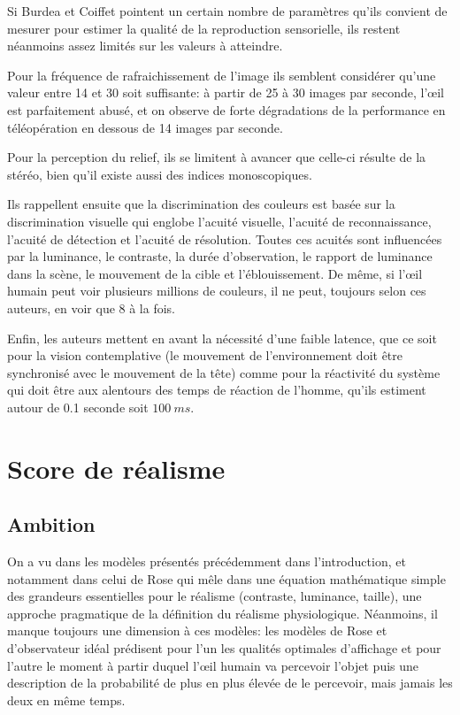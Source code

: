 	\par Si Burdea et Coiffet pointent un certain nombre de paramètres qu'ils convient de mesurer pour estimer la qualité de la reproduction sensorielle, ils restent néanmoins assez limités sur les valeurs à atteindre.
	
	\par Pour la fréquence de rafraichissement de l'image ils semblent considérer qu'une valeur entre 14 et 30 soit suffisante: à partir de 25 à 30 images par seconde, l'œil est parfaitement abusé, et on observe de forte dégradations de la performance en téléopération en dessous de 14 images par seconde.
	
	\par Pour la perception du relief, ils se limitent à avancer que celle-ci résulte de la stéréo, bien qu'il existe aussi des indices monoscopiques.
	
	\par Ils rappellent ensuite que la discrimination des couleurs est basée sur la discrimination visuelle qui englobe l'acuité visuelle, l'acuité de reconnaissance, l'acuité de détection et l'acuité de résolution. Toutes ces acuités sont influencées par la luminance, le contraste, la durée d'observation, le rapport de luminance dans la scène, le mouvement de la cible et l'éblouissement. De même, si l'œil humain peut voir plusieurs millions de couleurs, il ne peut, toujours selon ces auteurs, en voir que 8 à la fois.
	
	\par Enfin, les auteurs mettent en avant la nécessité d'une faible latence, que ce soit pour la vision contemplative (le mouvement de l'environnement doit être synchronisé avec le mouvement de la tête) comme pour la réactivité du système qui doit être aux alentours des temps de réaction de l'homme, qu'ils estiment autour de 0.1 seconde soit $100~ms$.
	
	\chapter{Score de réalisme}
	\section{Ambition}	
	\par On a vu dans les modèles présentés précédemment dans l'introduction, et notamment dans celui de Rose qui mêle dans une équation mathématique simple des grandeurs essentielles pour le réalisme (contraste, luminance, taille), une approche pragmatique de la définition du réalisme physiologique. Néanmoins, il manque toujours une dimension à ces modèles: les modèles de Rose et d'observateur idéal prédisent pour l'un les qualités optimales d'affichage et pour l'autre le moment à partir duquel l'œil humain va percevoir l'objet puis une description de la probabilité de plus en plus élevée de le percevoir, mais jamais les deux en même temps.
	
